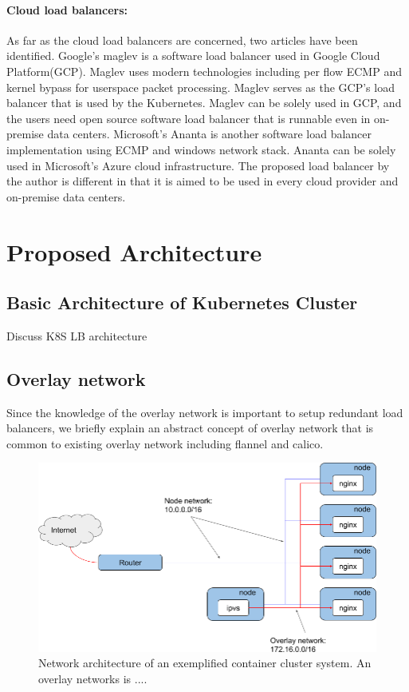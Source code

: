 \paragraph{\bf Cloud load balancers:}

As far as the cloud load balancers are concerned, two articles have been identified.
Google's maglev\cite{eisenbud2016maglev} is a software load balancer used in Google Cloud Platform(GCP)\cite{Voellm2013}.
Maglev uses modern technologies including per flow ECMP and kernel bypass for userspace packet processing.
Maglev serves as the GCP's load balancer that is used by the Kubernetes.
Maglev can be solely used in GCP, and the users need open source software load balancer that is runnable even in on-premise data centers.
Microsoft's Ananta\cite{patel2013ananta} is another software load balancer implementation using ECMP and windows network stack.
Ananta can be solely used in Microsoft's Azure cloud infrastructure\cite{patel2013ananta}.
The proposed load balancer by the author is different in that it is aimed to be used in every cloud provider and on-premise data centers.

\section{Proposed Architecture}\label{Architecture}
\subsection{Basic Architecture of Kubernetes Cluster}
Discuss K8S LB architecture

\subsection{Overlay network}
Since the knowledge of the overlay network is important to setup redundant load balancers, 
we briefly explain an abstract concept of overlay network that is common to existing overlay network including flannel and calico.

\begin{figure}
\includegraphics[width=\columnwidth]{Figs/overlay.png}
\caption{Network architecture of an exemplified container cluster system. An overlay networks is .... }
\label{fig:overlay}
\end{figure}

